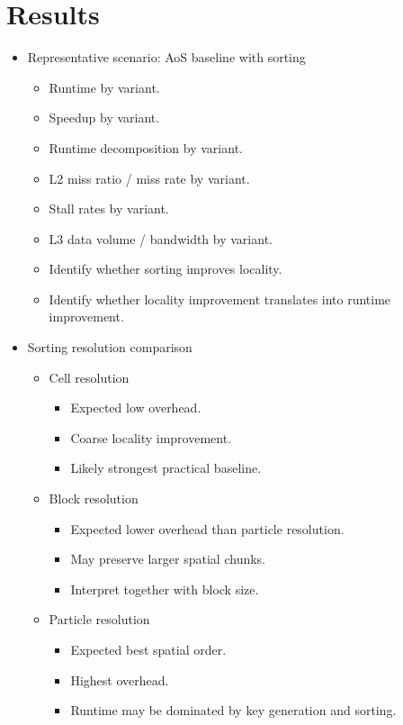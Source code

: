 \chapter{Results}
\label{ch:results}

\begin{itemize}
    \item Representative scenario: AoS baseline with sorting
    \begin{itemize}
        \item Runtime by variant.
        \item Speedup by variant.
        \item Runtime decomposition by variant.
        \item L2 miss ratio / miss rate by variant.
        \item Stall rates by variant.
        \item L3 data volume / bandwidth by variant.
        \item Identify whether sorting improves locality.
        \item Identify whether locality improvement translates into runtime improvement.
    \end{itemize}

    \item Sorting resolution comparison
    \begin{itemize}
        \item Cell resolution
        \begin{itemize}
            \item Expected low overhead.
            \item Coarse locality improvement.
            \item Likely strongest practical baseline.
        \end{itemize}
        \item Block resolution
        \begin{itemize}
            \item Expected lower overhead than particle resolution.
            \item May preserve larger spatial chunks.
            \item Interpret together with block size.
        \end{itemize}
        \item Particle resolution
        \begin{itemize}
            \item Expected best spatial order.
            \item Highest overhead.
            \item Runtime may be dominated by key generation and sorting.
        \end{itemize}
    \end{itemize}


\end{itemize}
